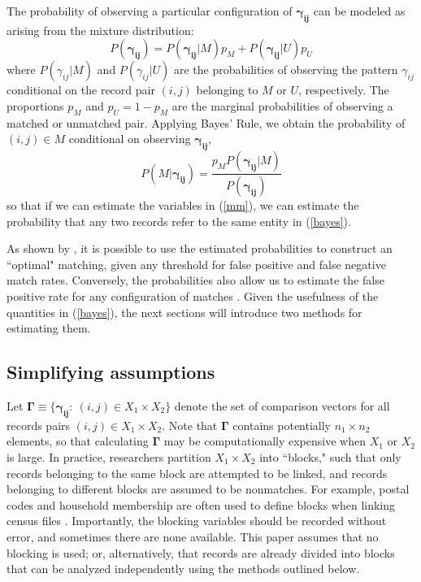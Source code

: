 \documentclass[12pt]{article}
\newcommand\gamij{\mathbf{\gamma_{ij}}}
\begin{document}
The probability of observing a particular configuration of $\gamij$ can be modeled as arising from the mixture distribution:
\begin{equation}
P(\gamij) = P(\gamij | M) p_M + P(\gamij | U) p_U 
\label{mm}
\end{equation}
where $P(\gamma_{ij} | M)$ and $P(\gamma_{ij} | U)$ are the probabilities of observing the pattern $\gamma_{ij}$ conditional on the record pair $(i,j)$ belonging to $M$ or $U$, respectively.  The proportions $p_M$ and $p_U = 1-p_M$ are the marginal probabilities of observing a matched or unmatched pair.  Applying Bayes' Rule, we obtain the probability of $(i,j) \in M$ conditional on observing $\gamij$,
\begin{equation} P(M | \gamij) = \frac{p_M P(\gamij | M)}{P(\gamij)} \label{bayes} \end{equation}
so that if we can estimate the variables in (\ref{mm}), we can estimate the probability that any two records refer to the same entity in (\ref{bayes}).  

As shown by \cite{fellegi69}, it is possible to use the estimated probabilities to construct an ``optimal" matching, given any threshold for false positive and false negative match rates.  Conversely, the probabilities also allow us to estimate the false positive rate for any configuration of matches \citep{bda3}.  Given the usefulness of the quantities in (\ref{bayes}), the next sections will introduce two methods for estimating them.

\subsection{Simplifying assumptions}

Let $\mathbf{\Gamma} \equiv \{\mathbf{\gamma_{ij}}: \  (i,j) \in X_1\times X_2\}$ denote the set of comparison vectors for all records pairs $(i,j) \in X_1\times X_2$.   Note that $\mathbf{\Gamma}$ contains potentially $n_1 \times n_2$ elements, so that calculating $\mathbf{\Gamma}$ may be computationally expensive when $X_1$ or $X_2$ is large.  In practice, researchers partition $X_1\times X_2$ into ``blocks," such that only records belonging to the same block are attempted to be linked, and records belonging to different blocks are assumed to be nonmatches.  For example, postal codes and household membership are often used to define blocks when linking census files \citep{herzog2007}.  Importantly, the blocking variables should be recorded without error, and sometimes there are none available. 
This paper assumes that no blocking is used; or, alternatively, that records are already divided into blocks that can be analyzed independently using the methods outlined below.  
\end{document}
